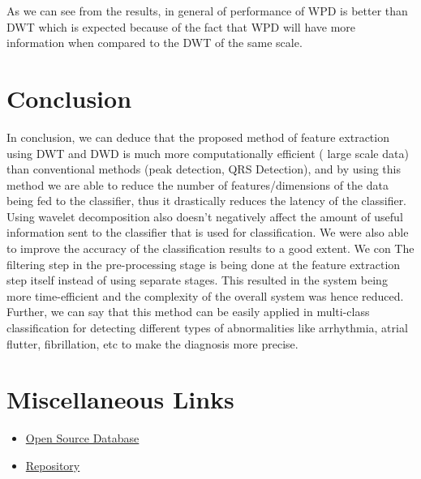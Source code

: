 \documentclass[10pt,twocolumn,letterpaper]{article}
\begin{document}
As we can see from the results, in general of performance of WPD is better than DWT which is expected because of the fact that WPD will have more information when compared to the DWT of the same scale. 



\section{Conclusion}
In conclusion, we can deduce that the proposed method of feature extraction using DWT and DWD is much more computationally efficient ( large scale data) than conventional methods (peak detection, QRS Detection), and by using this method we are able to reduce the number of features/dimensions of the data being fed to the classifier, thus it drastically reduces the latency of the classifier.
Using wavelet decomposition also doesn’t negatively affect the amount of useful information sent to the classifier that is used for classification.
We were also able to improve the accuracy of the classification results to a good extent. We con
The filtering step in the pre-processing stage is being done at the feature extraction step itself instead of using separate stages. This resulted in the system being more time-efficient and the complexity of the overall system was hence reduced.
Further, we can say that this method can be easily applied in multi-class classification for detecting different types of abnormalities like arrhythmia, atrial flutter, fibrillation, etc to make the diagnosis more precise.


{\small


}


\section*{Miscellaneous Links}
\begin{itemize}
    \item \href{https://physionet.org/content/mitdb/1.0.0/}{Open Source Database}
    \item \href{https://github.com/abhishekkhare1998/EcgClassificationProject}{Repository}
\end{itemize}
\end{document}
